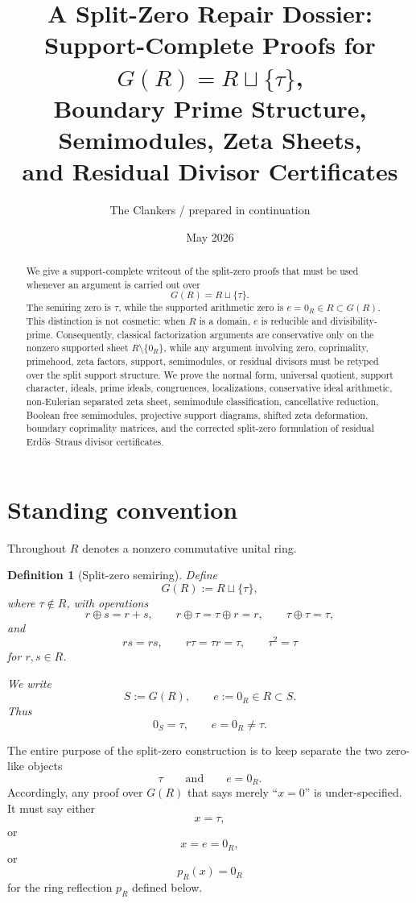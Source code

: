 \documentclass[11pt]{article}
\title{
A Split-Zero Repair Dossier:\\
Support-Complete Proofs for \(G(R)=R\sqcup\{\tau\}\),\\
Boundary Prime Structure, Semimodules, Zeta Sheets,\\
and Residual Divisor Certificates
}
\author{The Clankers / prepared in continuation}
\date{May 2026}
\newtheorem{definition}[theorem]{Definition}
\begin{document}
\maketitle

\begin{abstract}
We give a support-complete writeout of the split-zero proofs that must be used whenever an argument is carried out over
\[
G(R)=R\sqcup\{\tau\}.
\]
The semiring zero is \(\tau\), while the supported arithmetic zero is \(e=0_R\in R\subset G(R)\). This distinction is not cosmetic: when \(R\) is a domain, \(e\) is reducible and divisibility-prime. Consequently, classical factorization arguments are conservative only on the nonzero supported sheet \(R\setminus\{0_R\}\), while any argument involving zero, coprimality, primehood, zeta factors, support, semimodules, or residual divisors must be retyped over the split support structure. We prove the normal form, universal quotient, support character, ideals, prime ideals, congruences, localizations, conservative ideal arithmetic, non-Eulerian separated zeta sheet, semimodule classification, cancellative reduction, Boolean free semimodules, projective support diagrams, shifted zeta deformation, boundary coprimality matrices, and the corrected split-zero formulation of residual Erdős--Straus divisor certificates.
\end{abstract}

\tableofcontents

\section{Standing convention}

Throughout \(R\) denotes a nonzero commutative unital ring.

\begin{definition}[Split-zero semiring]
Define
\[
G(R):=R\sqcup\{\tau\},
\]
where \(\tau\notin R\), with operations
\[
r\oplus s=r+s,\qquad r\oplus\tau=\tau\oplus r=r,\qquad \tau\oplus\tau=\tau,
\]
and
\[
rs=rs,\qquad r\tau=\tau r=\tau,\qquad \tau^2=\tau
\]
for \(r,s\in R\).

We write
\[
S:=G(R),\qquad e:=0_R\in R\subset S.
\]
Thus
\[
0_S=\tau,\qquad e=0_R\neq\tau.
\]
\end{definition}

The entire purpose of the split-zero construction is to keep separate the two zero-like objects
\[
\tau
\qquad\text{and}\qquad
e=0_R.
\]
Accordingly, any proof over \(G(R)\) that says merely ``\(x=0\)'' is under-specified. It must say either
\[
x=\tau,
\]
or
\[
x=e=0_R,
\]
or
\[
p_R(x)=0_R
\]
for the ring reflection \(p_R\) defined below.
\end{document}
